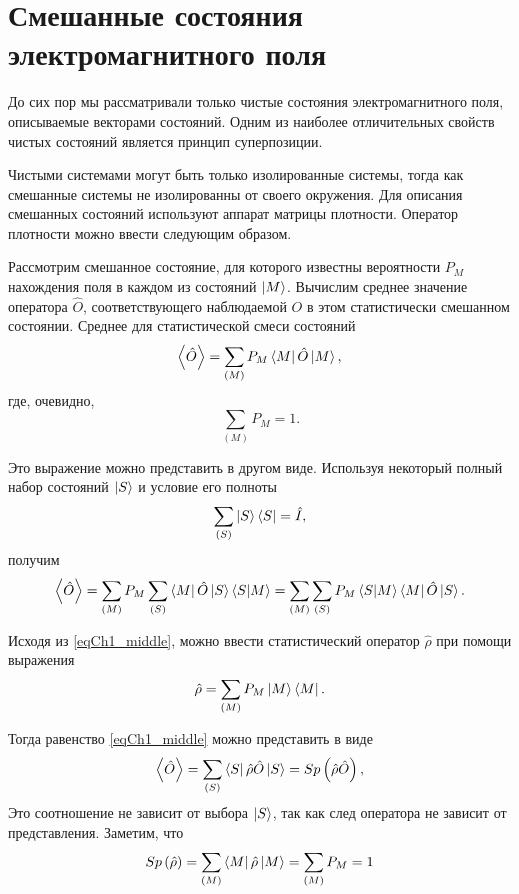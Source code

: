 \section{Смешанные состояния электромагнитного поля}
До сих пор мы рассматривали только чистые состояния электромагнитного
поля, описываемые векторами состояний. 
Одним из наиболее отличительных свойств чистых состояний является
принцип суперпозиции. 

Чистыми системами могут быть только изолированные системы, тогда как
смешанные системы не изолированны от своего окружения. Для описания
смешанных состояний используют аппарат матрицы плотности. Оператор
плотности можно ввести следующим образом.  

Рассмотрим смешанное состояние, для которого известны вероятности
$P_M$
нахождения поля в каждом из состояний 
$\ket{M}$.  Вычислим среднее значение
оператора $\hat{O}$,  соответствующего наблюдаемой $O$ в этом статистически
смешанном состоянии. Среднее для статистической смеси состояний  
\begin{equation}
\left<\hat{O}\right> = \sum_{(M)} P_M\bra{M}\hat{O}\ket{M},
\end{equation}
где, очевидно, 
\[
\sum_{(M)} P_M = 1.
\]

Это выражение можно представить в другом виде. Используя некоторый
полный набор состояний $\ket{S}$   и условие его полноты 
\[
\sum_{(S)}\ket{S}\bra{S} = \hat{I},
\]
получим
\begin{equation}
\left<\hat{O}\right> = \sum_{(M)}
P_M\sum_{(S)}\bra{M}\hat{O}\ket{S}\bra{S}\ket{M}
= \sum_{(M)}\sum_{(S)}P_M\bra{S}\ket{M}\bra{M}\hat{O}\ket{S}.
\label{eqCh1_middle}
\end{equation}

Исходя из \eqref{eqCh1_middle}, можно ввести статистический оператор $\hat{\rho}$  при помощи выражения
\begin{equation}
\hat{\rho} = \sum_{(M)}
P_M\ket{M}\bra{M}.
\end{equation}

Тогда равенство \eqref{eqCh1_middle} можно представить в виде
\begin{equation}
\left<\hat{O}\right> = \sum_{(S)}
\bra{S}\hat{\rho}\hat{O}\ket{S} = Sp \left(\hat{\rho}\hat{O}\right),
\end{equation}
Это соотношение не зависит от выбора  $\ket{S}$,  так как след
оператора не зависит от представления. Заметим, что 
\begin{equation}
Sp \left(\hat{\rho}\right) = \sum_{(M)}
\bra{M}\hat{\rho}\ket{M} = \sum_{(M)} P_M = 1
\label{eqCh1_spequal1}
\end{equation}

